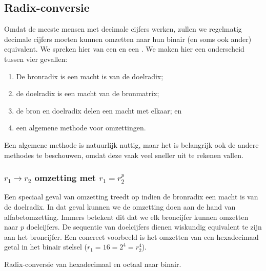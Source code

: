 \subsection{Radix-conversie}
Omdat de meeste mensen met decimale cijfers werken, zullen we regelmatig decimale cijfers moeten kunnen omzetten naar hun binair (en soms ook ander) equivalent. We spreken hier van een  en een . We maken hier een onderscheid tussen vier gevallen:

\begin{enumerate}
 \item De bronradix is een macht is van de doelradix;
 \item de doelradix is een macht van de bronmatrix;
 \item de bron en doelradix delen een macht met elkaar; en
 \item een algemene methode voor omzettingen.
\end{enumerate}

Een algemene methode is natuurlijk nuttig, maar het is belangrijk ook de andere methodes te beschouwen, omdat deze vaak veel sneller uit te rekenen vallen.

\subsubsection{$r_1\rightarrow r_2$ omzetting met $r_1=r_2^p$}
Een speciaal geval van omzetting treedt op indien de bronradix een macht is van de doelradix. In dat geval kunnen we de omzetting doen aan de hand van alfabetomzetting. Immers betekent dit dat we elk broncijfer kunnen omzetten naar $p$ doelcijfers. De sequentie van doelcijfers dienen wiskundig equivalent te zijn aan het broncijfer. Een concreet voorbeeld is het omzetten van een hexadecimaal getal in het binair stelsel ($r_1=16=2^4=r_2^4$).

\begin{table}[hbt]
\centering
{}
\caption{Radix-conversie van hexadecimaal en octaal naar binair.}
\end{table}

